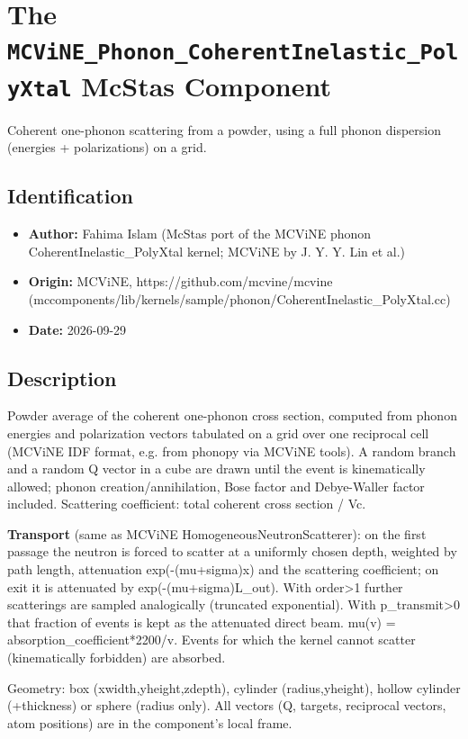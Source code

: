 \section{The \texttt{MCViNE\_Phonon\_CoherentInelastic\_PolyXtal} McStas Component}
Coherent one-phonon scattering from a powder, using a full phonon dispersion (energies + polarizations) on a grid.

\subsection*{Identification}
\begin{itemize}
  \item \textbf{Author:} Fahima Islam (McStas port of the MCViNE phonon CoherentInelastic\_PolyXtal kernel; MCViNE by J. Y. Y. Lin et al.)
  \item \textbf{Origin:} MCViNE, https://github.com/mcvine/mcvine (mccomponents/lib/kernels/sample/phonon/CoherentInelastic\_PolyXtal.cc)
  \item \textbf{Date:} 2026-09-29
\end{itemize}

\subsection*{Description}
Powder average of the coherent one-phonon cross section, computed from phonon energies and polarization vectors tabulated on a grid over one reciprocal cell (MCViNE IDF format, e.g. from phonopy via MCViNE tools). A random branch and a random Q vector in a cube are drawn until the event is kinematically allowed; phonon creation/annihilation, Bose factor and Debye-Waller factor included. Scattering coefficient: total coherent cross section / Vc.

\textbf{Transport} (same as MCViNE HomogeneousNeutronScatterer): on the first passage the neutron is forced to scatter at a uniformly chosen depth, weighted by path length, attenuation exp(-(mu+sigma)x) and the scattering coefficient; on exit it is attenuated by exp(-(mu+sigma)L\_out). With order\textgreater{}1 further scatterings are sampled analogically (truncated exponential). With p\_transmit\textgreater{}0 that fraction of events is kept as the attenuated direct beam. mu(v) = absorption\_coefficient*2200/v. Events for which the kernel cannot scatter (kinematically forbidden) are absorbed.

Geometry: box (xwidth,yheight,zdepth), cylinder (radius,yheight), hollow cylinder (+thickness) or sphere (radius only). All vectors (Q, targets, reciprocal vectors, atom positions) are in the component's local frame.

